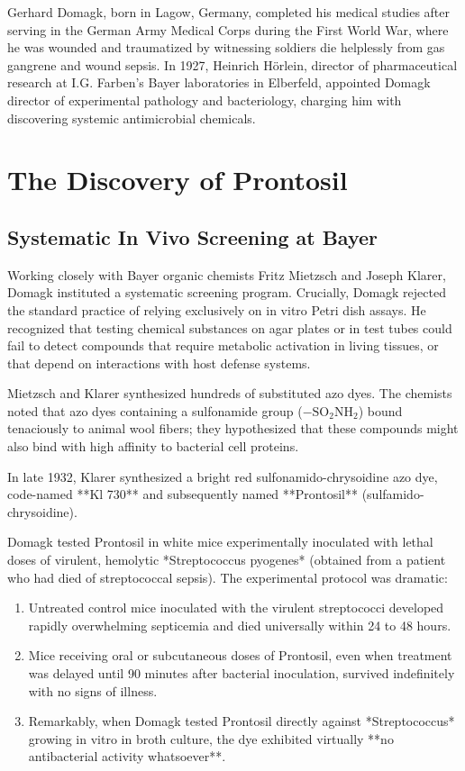 Gerhard Domagk, born in Lagow, Germany, completed his medical studies after serving in the German Army Medical Corps during the First World War, where he was wounded and traumatized by witnessing soldiers die helplessly from gas gangrene and wound sepsis. In 1927, Heinrich Hörlein, director of pharmaceutical research at I.G. Farben's Bayer laboratories in Elberfeld, appointed Domagk director of experimental pathology and bacteriology, charging him with discovering systemic antimicrobial chemicals.

\section{The Discovery of Prontosil}

\subsection{Systematic In Vivo Screening at Bayer}

Working closely with Bayer organic chemists Fritz Mietzsch and Joseph Klarer, Domagk instituted a systematic screening program. Crucially, Domagk rejected the standard practice of relying exclusively on in vitro Petri dish assays. He recognized that testing chemical substances on agar plates or in test tubes could fail to detect compounds that require metabolic activation in living tissues, or that depend on interactions with host defense systems.

Mietzsch and Klarer synthesized hundreds of substituted azo dyes. The chemists noted that azo dyes containing a sulfonamide group ($-\text{SO}_2\text{NH}_2$) bound tenaciously to animal wool fibers; they hypothesized that these compounds might also bind with high affinity to bacterial cell proteins.

In late 1932, Klarer synthesized a bright red sulfonamido-chrysoidine azo dye, code-named **Kl 730** and subsequently named **Prontosil** (sulfamido-chrysoidine). 

Domagk tested Prontosil in white mice experimentally inoculated with lethal doses of virulent, hemolytic *Streptococcus pyogenes* (obtained from a patient who had died of streptococcal sepsis). The experimental protocol was dramatic:
\begin{enumerate}
    \item Untreated control mice inoculated with the virulent streptococci developed rapidly overwhelming septicemia and died universally within 24 to 48 hours.
    \item Mice receiving oral or subcutaneous doses of Prontosil, even when treatment was delayed until 90 minutes after bacterial inoculation, survived indefinitely with no signs of illness.
    \item Remarkably, when Domagk tested Prontosil directly against *Streptococcus* growing in vitro in broth culture, the dye exhibited virtually **no antibacterial activity whatsoever**.
\end{enumerate}

